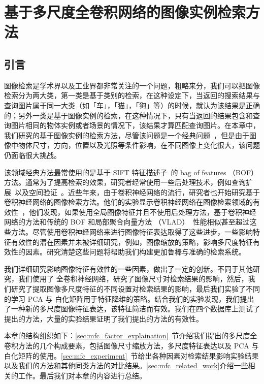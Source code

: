 
\chapter{基于多尺度全卷积网络的图像实例检索方法}\label{chapter:mfc}
\section{引言}
图像检索是学术界以及工业界都非常关注的一个问题，粗略来分，我们可以把图像检索分为两大类，第一类是基于类别的检索，在这种设定下，当返回的搜索结果与查询图片属于同一大类（如「车」，「猫」，「狗」等）的时候，就认为该结果是正确的；另外一类是基于图像实例的检索，在这种情况下，只有当返回的结果包含和查询图片相同的物体实例或者场景的情况下，该结果才算匹配查询图片。在本章中，我们研究的基于图像实例的检索方法，尽管该问题是一个经典问题~\cite{Sivic2003VideoGA,Nistr2006ScalableRW,Philbin2007ObjectRW,Razavian2014CNNFO,Babenko2014NeuralCF,Tolias2015ParticularOR,Babenko2015AggregatingLD}，但是由于图像中物体尺寸，方向，位置以及光照等条件影响，在不同图像上变化很大，该问题仍面临很大挑战。

该领域经典方法最常使用的是基于 SIFT 特征描述子~\cite{Lowe2004DistinctiveIF}的 bag of features （BOF）方法。通常为了提高检索的效果，研究者经常使用一些后处理技术，例如查询扩展~\cite{Chum2007TotalRA}以及空间验证~\cite{Philbin2007ObjectRW}。近些年来，由于卷积神经网络的流行，研究者也开始研究基于卷积神经网络的图像检索方法。他们的实验显示卷积神经网络在图像检索领域的有效性~\cite{Babenko2014NeuralCF,Razavian2014CNNFO,Tolias2015ParticularOR}，他们发现，如果使用全局图像特征并且不使用后处理方法，基于卷积神经网络的方法和传统的 BOF 和局部聚合向量方法 （VLAD）~\cite{Jgou2010AggregatingLD}性能相似甚至超过这些方法。尽管使用卷积神经网络来进行图像特征表达取得了这些进步，一些影响特征有效性的潜在因素并未被详细研究，例如，图像缩放的策略，影响多尺度特征有效性的因素。研究清楚这些问题将帮助我们构建更加鲁棒与准确的检索系统。

我们详细研究影响图像特征有效性的一些因素，做出了一定的创新。不同于其他研究，我们使用了
全卷积神经网络，研究了图像尺寸对检索结果的影响，然后，我们研究了提取图像多尺度特征的不同设置对检索结果的影响，最后我们实验了不同的学习 PCA 与 白化矩阵用于特征降维的策略。结合我们的实验发现，我们提出了一种新的多尺度图像特征表达，该特征简洁而有效。我们在四个数据库上测试了提出的方法，大量的实验结果证明了我们提出的方法的有效性。

本章的结构组织如下：\ref{sec:mfc_factor_explaination}~节介绍我们提出的多尺度全卷积方法的几个构成要素，包括图像尺寸缩放方法，多尺度特征表达以及 PCA 与白化矩阵的使用。\ref{sec:mfc_experiment}~节给出各种因素对检索结果影响实验结果以及我们的方法和其他同类方法的对比结果。\ref{sec:mfc_related_work}介绍一些相关的工作。最后我们对本章的内容进行总结。

